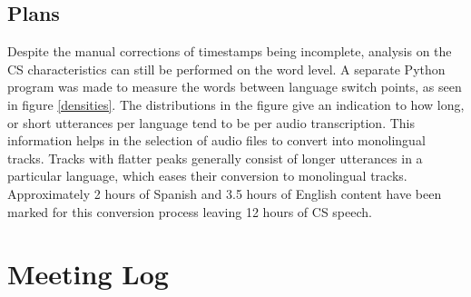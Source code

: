 \documentclass[11pt, a4paper]{report}
\begin{document}

\subsection*{Plans}
Despite the manual corrections of timestamps being incomplete, analysis on the CS 
characteristics can still be performed on the word level. A separate Python program 
was made to measure the words between language switch points, as seen in 
figure \ref*{densities}. The distributions in the figure give an indication to 
how long, or short utterances per language tend to be per audio transcription.
This information helps in the selection of audio files to convert into monolingual 
tracks. Tracks with flatter peaks generally consist of longer utterances in a 
particular language, which eases their conversion to monolingual tracks. 
Approximately 2 hours of Spanish and 3.5 hours of English content 
have been marked for this conversion process leaving 12 hours of CS speech.





\newpage
\section*{Meeting Log}


\end{document}
